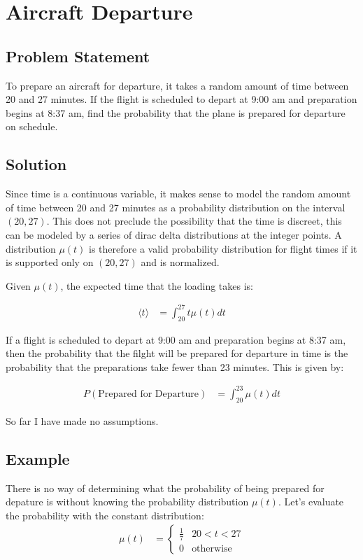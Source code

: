 \documentclass{article}
\begin{document}
\section{Aircraft Departure}

\subsection{Problem Statement}

To prepare an aircraft for departure, it takes a random amount of time
	between 20 and 27 minutes.
If the flight is scheduled to depart at 9:00 am and preparation begins at 8:37
	am, find the probability that the plane is prepared for departure on
	schedule.

\subsection{Solution}

Since time is a continuous variable, it makes sense to model the random
	amount of time between 20 and 27 minutes as a probability distribution
	on the interval $(20,27)$.
This does not preclude the possibility that the time is discreet, this can 
	be modeled by a series of dirac delta distributions at the integer points.
A distribution $\mu(t)$ is therefore a valid probability distribution for flight
	times if it is supported only on $(20,27)$ and is normalized.

Given $\mu(t)$, the expected time that the loading takes is:

\begin{align}
\langle t \rangle & = \int_{20}^{27} t \mu(t) dt
\end{align}

If a flight is scheduled to depart at 9:00 am and preparation begins at 8:37
	am, then the probability that the filght will be prepared for departure
	in time is the probability that the preparations take fewer than 23 minutes.
This is given by:

\begin{align}
P\left( \text{Prepared for Departure} \right)
	& = \int_{20}^{23} \mu(t) dt
\end{align}

So far I have made no assumptions.

\subsection{Example}
There is no way of determining what the probability of being prepared for depature
	is without knowing the probability distribution $\mu(t)$.
Let's evaluate the probability with the constant distribution:
\begin{align}
\mu(t) & = \begin{cases} \frac{1}{7} & 20 < t < 27 \\
	0 & \text{otherwise} \end{cases}
\end{align}
\end{document}
